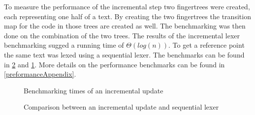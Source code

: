 To measure the performance of the incremental step two fingertrees were created,
each representing one half of a text. By creating the two fingertrees the
transition map for the code in those trees are created as well. The benchmarking
was then done on the combination of the two trees. The results of the incremental
lexer benchmarking sugged a running time of $\Theta(log(n))$. To get a reference
point the same text was lexed using a sequential lexer. The benchmarks can be
found in \cref{fig:IncSeqTime} and \cref{fig:IncTime}. More details on the
performance benchmarks can be found in \cref{preformanceAppendix}.

\begin{figure}[!h]
\caption{Benchmarking times of an incremental update\label{fig:IncTime}}
\end{figure}

\begin{figure}[!h]
\caption{Comparison between an incremental update and sequential lexer\label{fig:IncSeqTime}}
\end{figure}

